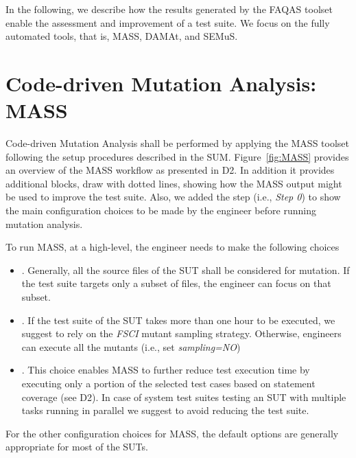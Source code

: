 In the following, we describe how the results generated by the FAQAS toolset enable the assessment and improvement of a test suite.
We focus on the fully automated tools, that is, MASS, DAMAt, and SEMuS.


\section{Code-driven Mutation Analysis: MASS}
\label{sec:meth:mass} 
 
Code-driven Mutation Analysis shall be performed by applying the MASS toolset following the setup procedures described in the SUM. Figure~\ref{fig:MASS} provides an overview of the MASS workflow as presented in D2. In addition it provides additional blocks, draw with dotted lines, showing how the MASS output might be used to improve the test suite. Also, we added the step  (i.e., \emph{Step 0}) to show the main configuration choices to be made by the engineer before running mutation analysis.

To run MASS, at a high-level, the engineer needs to make the following choices
\begin{itemize}
\item {}. Generally, all the source files of the SUT shall be considered for mutation. If the test suite targets only a subset  of files, the engineer can focus on that subset.
\item {}. If the test suite of the SUT takes more than one hour to be executed, we suggest to rely on the \emph{FSCI} mutant sampling strategy. Otherwise, engineers can execute all the mutants (i.e., set \emph{sampling=NO})
\item {}. This choice enables MASS to further reduce test execution time by executing only a portion of the selected test cases based on statement coverage (see D2). In case of system test suites testing an SUT with multiple tasks running in parallel we suggest to avoid reducing the test suite.
\end{itemize}

For the other configuration choices for MASS, the default options are generally appropriate for most of the SUTs.

